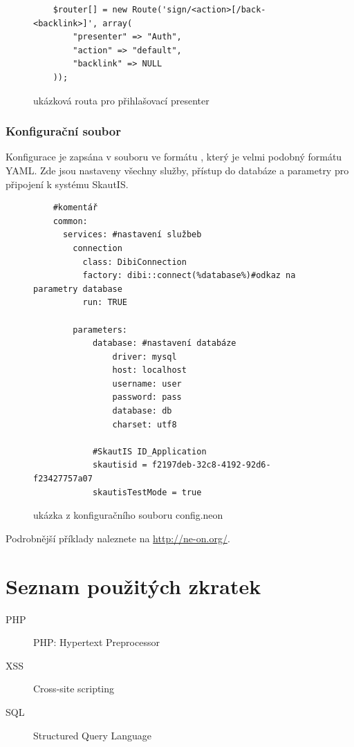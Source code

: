 \documentclass[thesis=B,czech]{FITthesis}[2011/06/14]
\begin{document}
\begin{figure}[h]\centering
	\begin{verbatim}
	$router[] = new Route('sign/<action>[/back-<backlink>]', array(
	    "presenter" => "Auth",
	    "action" => "default",
	    "backlink" => NULL
	));
	\end{verbatim}
 	\caption{ukázková routa pro přihlašovací presenter}
\end{figure}

\subsection{Konfigurační soubor}
Konfigurace je zapsána v souboru  ve formátu , který je velmi podobný formátu YAML. Zde jsou nastaveny všechny služby, přístup do databáze a parametry pro připojení k systému SkautIS.
\begin{figure}[h]\centering
	\begin{verbatim}
	#komentář
	common:
	  services: #nastavení službeb
	    connection
	      class: DibiConnection
	      factory: dibi::connect(%database%)#odkaz na parametry database
	      run: TRUE        
	
	    parameters:
	        database: #nastavení databáze
	            driver: mysql
	            host: localhost
	            username: user
	            password: pass
	            database: db
	            charset: utf8
	
	        #SkautIS ID_Application
	        skautisid = f2197deb-32c8-4192-92d6-f23427757a07
	        skautisTestMode = true
	\end{verbatim}
 	\caption{ukázka z konfiguračního souboru config.neon}
\end{figure}
Podrobnější příklady naleznete na \url{http://ne-on.org/}. 












\begin{conclusion}
\end{conclusion}





\appendix

\chapter{Seznam použitých zkratek}
\begin{description}
	\item[PHP] PHP: Hypertext Preprocessor
	\item[XSS] Cross-site scripting
	\item[SQL] Structured Query Language
\end{description}
\end{document}
